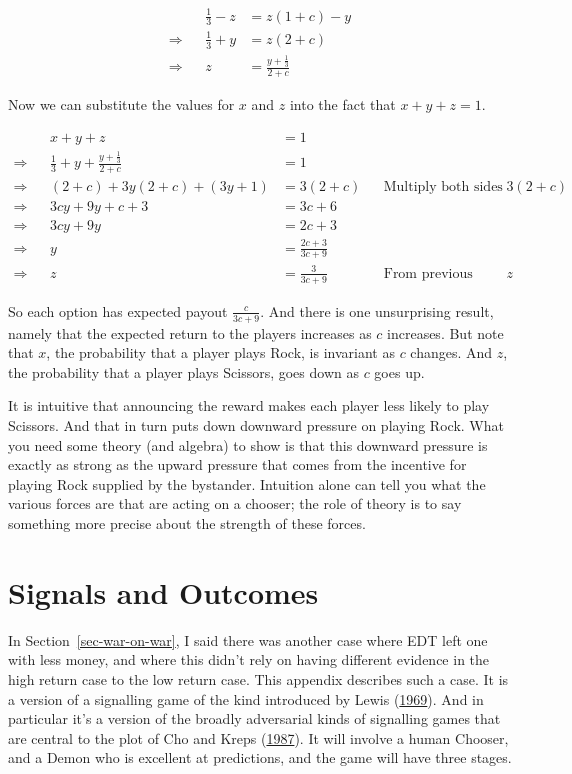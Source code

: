 \documentclass[
  12pt,
  letterpaper,
  DIV=11,
  numbers=noendperiod]{scrreprt}
\begin{document}
\begin{align*}
&& \frac{1}{3} - z &= z(1+c) - y \\
\Rightarrow && \frac{1}{3} + y &= z(2+c) \\
\Rightarrow && z &= \frac{y + \frac{1}{3}}{2 + c}
\end{align*}

Now we can substitute the values for \(x\) and \(z\) into the fact that
\(x+y+z=1\).

\begin{align*}
&& x + y + z &= 1  && \\
\Rightarrow && \frac{1}{3} + y + \frac{y + \frac{1}{3}}{2 + c} &= 1 && \\
\Rightarrow && (2+c) + 3y(2+c) + (3y+1) &= 3(2+c) && \text{Multiply both sides by } 3(2+c) \\
\Rightarrow && 3cy + 9y + c + 3 &= 3c + 6 \\
\Rightarrow && 3cy + 9y &= 2c + 3 \\
\Rightarrow && y &= \frac{2c + 3}{3c + 9} \\
\Rightarrow && z &= \frac{3}{3c + 9} && \text{From previous derivation for }z
\end{align*}

So each option has expected payout \(\frac{c}{3c+9}\). And there is one
unsurprising result, namely that the expected return to the players
increases as \(c\) increases. But note that \(x\), the probability that
a player plays Rock, is invariant as \(c\) changes. And \(z\), the
probability that a player plays Scissors, goes down as \(c\) goes up.

It is intuitive that announcing the reward makes each player less likely
to play Scissors. And that in turn puts down downward pressure on
playing Rock. What you need some theory (and algebra) to show is that
this downward pressure is exactly as strong as the upward pressure that
comes from the incentive for playing Rock supplied by the bystander.
Intuition alone can tell you what the various forces are that are acting
on a chooser; the role of theory is to say something more precise about
the strength of these forces.

\hypertarget{sec-war-signal}{%
\chapter{Signals and Outcomes}\label{sec-war-signal}}

In Section~\ref{sec-war-on-war}, I said there was another case where EDT
left one with less money, and where this didn't rely on having different
evidence in the high return case to the low return case. This appendix
describes such a case. It is a version of a signalling game of the kind
introduced by Lewis (\protect\hyperlink{ref-Lewis1969a}{1969}). And in
particular it's a version of the broadly adversarial kinds of signalling
games that are central to the plot of Cho and Kreps
(\protect\hyperlink{ref-ChoKreps1987}{1987}). It will involve a human
Chooser, and a Demon who is excellent at predictions, and the game will
have three stages.
\end{document}
